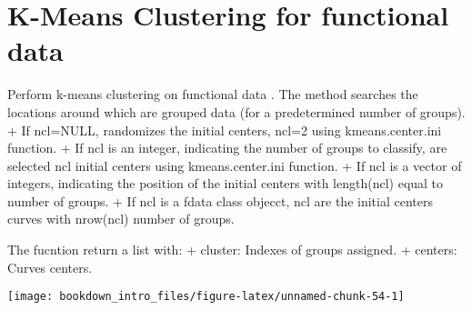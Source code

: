 \documentclass[
]{book}
\newenvironment{Shaded}{\begin{snugshade}}{\end{snugshade}}
\newcommand{\AttributeTok}[1]{\textcolor[rgb]{0.77,0.63,0.00}{#1}}
\newcommand{\CommentTok}[1]{\textcolor[rgb]{0.56,0.35,0.01}{\textit{#1}}}
\newcommand{\ConstantTok}[1]{\textcolor[rgb]{0.00,0.00,0.00}{#1}}
\newcommand{\DecValTok}[1]{\textcolor[rgb]{0.00,0.00,0.81}{#1}}
\newcommand{\FunctionTok}[1]{\textcolor[rgb]{0.00,0.00,0.00}{#1}}
\newcommand{\NormalTok}[1]{#1}
\newcommand{\OtherTok}[1]{\textcolor[rgb]{0.56,0.35,0.01}{#1}}
\newcommand{\SpecialCharTok}[1]{\textcolor[rgb]{0.00,0.00,0.00}{#1}}
\begin{document}
\hypertarget{k-means-clustering-for-functional-data}{%
\section{K-Means Clustering for functional data}\label{k-means-clustering-for-functional-data}}

Perform k-means clustering on functional data \citep{hartigan1979algorithm}.
The method searches the locations around which are grouped data (for a predetermined number of groups).
+ If ncl=NULL, randomizes the initial centers, ncl=2 using kmeans.center.ini function.
+ If ncl is an integer, indicating the number of groups to classify,
are selected ncl initial centers using kmeans.center.ini function.
+ If ncl is a vector of integers, indicating the position of the initial centers with length(ncl) equal to number of groups.
+ If ncl is a fdata class objecct, ncl are the initial centers curves with nrow(ncl) number of groups.

The fucntion return a list with:
+ cluster: Indexes of groups assigned.
+ centers: Curves centers.

\begin{Shaded}
\end{Shaded}

\begin{center}\texttt{[image: bookdown\_intro\_files/figure-latex/unnamed-chunk-54-1]} \end{center}
\end{document}
